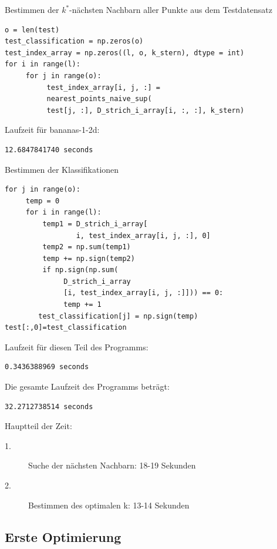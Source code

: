 \documentclass{beamer}
\begin{document}
\begin{frame}[fragile]
Bestimmen der $k^*$-nächsten Nachbarn aller Punkte aus dem Testdatensatz
\begin{verbatim}
o = len(test)
test_classification = np.zeros(o)
test_index_array = np.zeros((l, o, k_stern), dtype = int)
for i in range(l):
     for j in range(o):
          test_index_array[i, j, :] =
          nearest_points_naive_sup(
          test[j, :], D_strich_i_array[i, :, :], k_stern)
\end{verbatim}
Laufzeit für bananas-1-2d:
\begin{verbatim}
12.6847841740 seconds
\end{verbatim}
\end{frame}

\begin{frame}[fragile]
Bestimmen der Klassifikationen
\begin{verbatim}
for j in range(o):
     temp = 0
     for i in range(l):
         temp1 = D_strich_i_array[
                 i, test_index_array[i, j, :], 0]
         temp2 = np.sum(temp1)
         temp += np.sign(temp2)
         if np.sign(np.sum(
              D_strich_i_array
              [i, test_index_array[i, j, :]])) == 0:
              temp += 1
        test_classification[j] = np.sign(temp)
test[:,0]=test_classification
\end{verbatim}
\end{frame}

\begin{frame}[fragile]
Laufzeit für diesen Teil des Programms:
\begin{verbatim}
0.3436388969 seconds
\end{verbatim}
Die gesamte Laufzeit des Programms beträgt:
\begin{verbatim}
32.2712738514 seconds
\end{verbatim}
Hauptteil der Zeit:
\begin{description}
\item[1.] Suche der nächsten Nachbarn: 18-19 Sekunden
\item[2.] Bestimmen des optimalen k: 13-14 Sekunden
\end{description}
\end{frame}


\subsection{Erste Optimierung}
\end{document}
